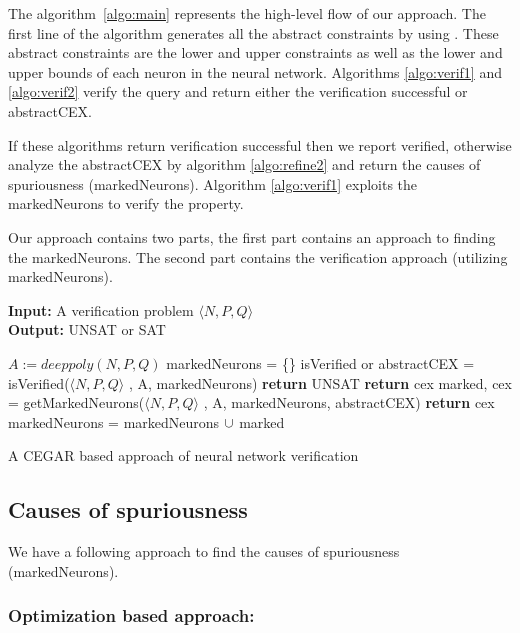 The algorithm~\ref{algo:main} represents the high-level flow of our approach.
The first line of the algorithm generates all the abstract constraints by using \deeppoly{}. 
These abstract constraints are the lower and upper constraints as well as the lower and upper bounds 
of each neuron in the neural network. Algorithms \ref{algo:verif1} and \ref{algo:verif2} verify the query 
and return either the verification successful or abstractCEX. 

If these algorithms return verification successful then we report verified,
otherwise analyze the abstractCEX by algorithm \ref{algo:refine2} and return the causes of spuriousness (markedNeurons). 
Algorithm \ref{algo:verif1} exploits the markedNeurons to verify the property. 

Our approach contains two parts, the first part contains an approach to finding the markedNeurons. 
The second part contains the verification approach (utilizing markedNeurons).

\begin{algorithm}[t]
  \textbf{Input: } A verification problem $\langle N,P,Q \rangle$ \\
  \textbf{Output: } UNSAT or SAT
  \begin{algorithmic}[1]
    \State $A := deeppoly(N,P,Q)$
    \State markedNeurons = \{\}
      \State isVerified or abstractCEX = isVerified($\langle N,P,Q \rangle$ , A, markedNeurons)
        \State \textbf{return} UNSAT
      \Else
          \State \textbf{return} cex
        \Else
          \State marked, cex = getMarkedNeurons($\langle N,P,Q \rangle$ , A, markedNeurons, abstractCEX)
            \State \textbf{return} cex
          \EndIf
          \State markedNeurons = markedNeurons ${\cup}$ marked
        \EndIf
      \EndIf
    \EndWhile
  \end{algorithmic}
  \caption{A CEGAR based approach of neural network verification}
  \label{algo:main}
\end{algorithm}

\subsection{Causes of spuriousness} 
We have a following approach to find the causes of spuriousness (markedNeurons). 

\subsubsection{Optimization based approach: }

